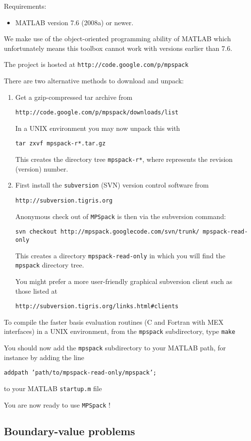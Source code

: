 \documentclass[12pt]{article}
\newcommand{\bi}{\begin{itemize}}
\newcommand{\ei}{\end{itemize}}
\newcommand{\ben}{\begin{enumerate}}
\newcommand{\een}{\end{enumerate}}
\begin{document}
Requirements:
\bi
\item MATLAB version 7.6 (2008a) or newer.
\ei

We make use of the object-oriented programming ability of MATLAB which
unfortunately means this toolbox cannot work with versions earlier than 7.6.


The project is hosted at
{\tt http://code.google.com/p/mpspack}

There are two alternative methods to download and unpack:
\ben
\item
Get a gzip-compressed tar archive from

{\tt http://code.google.com/p/mpspack/downloads/list}

In a UNIX environment you may now
unpack this with

{\tt tar zxvf mpspack-r*.tar.gz}

This creates the directory tree {\tt mpspack-r*}, where {\tt *} represents
the revision (version) number.

\item
First install the {\tt subversion} (SVN) version
control software from

{\tt http://subversion.tigris.org}

Anonymous check out of {\tt MPSpack} is then via the subversion command:

{\tt svn checkout http://mpspack.googlecode.com/svn/trunk/ mpspack-read-only}

This creates a directory {\tt mpspack-read-only} in which you will find
the {\tt mpspack} directory tree.

You might prefer a more user-friendly graphical
subversion client such as those listed at
 
{\tt http://subversion.tigris.org/links.html\#clients}

\een

To compile the faster basis evaluation routines (C and Fortran with MEX
interfaces)
in a UNIX environment,
from the {\tt mpspack} subdirectory, type {\tt make}

You should now add the {\tt mpspack}
subdirectory to your MATLAB path, for instance by adding the line

{\tt addpath 'path/to/mpspack-read-only/mpspack';}

to your MATLAB {\tt startup.m} file

You are now ready to use {\tt MPSpack} !


\subsection{Boundary-value problems}
\end{document}
